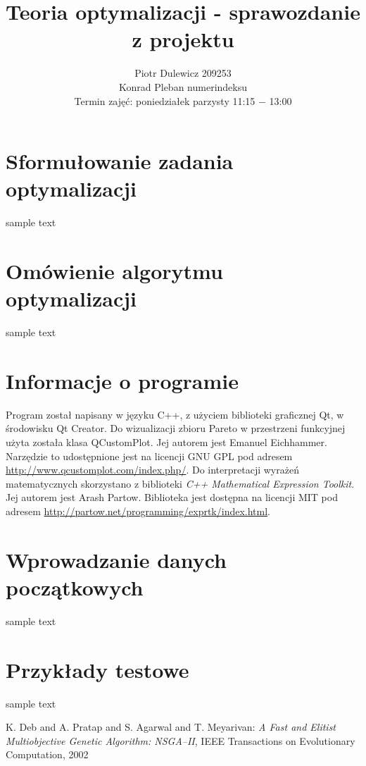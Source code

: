 \documentclass[11pt,a4paper]{article}
\title{Teoria optymalizacji - sprawozdanie z projektu}
\author{Piotr Dulewicz 209253 \\ Konrad Pleban numerindeksu \\ Termin zajęć: poniedziałek parzysty 11:15 \(-\) 13:00}
\date{}
\begin{document}
\maketitle
\section{Sformułowanie zadania optymalizacji}
sample text

\section{Omówienie algorytmu optymalizacji}
sample text

\section{Informacje o programie}
Program został napisany w języku C++, z użyciem biblioteki graficznej Qt, w środowisku Qt Creator. Do wizualizacji zbioru Pareto w przestrzeni funkcyjnej użyta została klasa QCustomPlot. Jej autorem jest Emanuel Eichhammer. Narzędzie to udostępnione jest na licencji GNU GPL pod adresem \url{http://www.qcustomplot.com/index.php/}. Do interpretacji wyrażeń matematycznych skorzystano z biblioteki \textit{C++ Mathematical Expression Toolkit}. Jej autorem jest Arash Partow. Biblioteka jest dostępna na licencji MIT pod adresem 
\url{http://partow.net/programming/exprtk/index.html}. 

\section{Wprowadzanie danych początkowych}
sample text

\section{Przykłady testowe}
sample text

\begin{thebibliography}{9}
 K. Deb and A. Pratap and S. Agarwal and T. Meyarivan:
\emph{A Fast and Elitist Multiobjective Genetic Algorithm: NSGA–II},
IEEE Transactions on Evolutionary Computation, 2002
\end{thebibliography}
\end{document}
